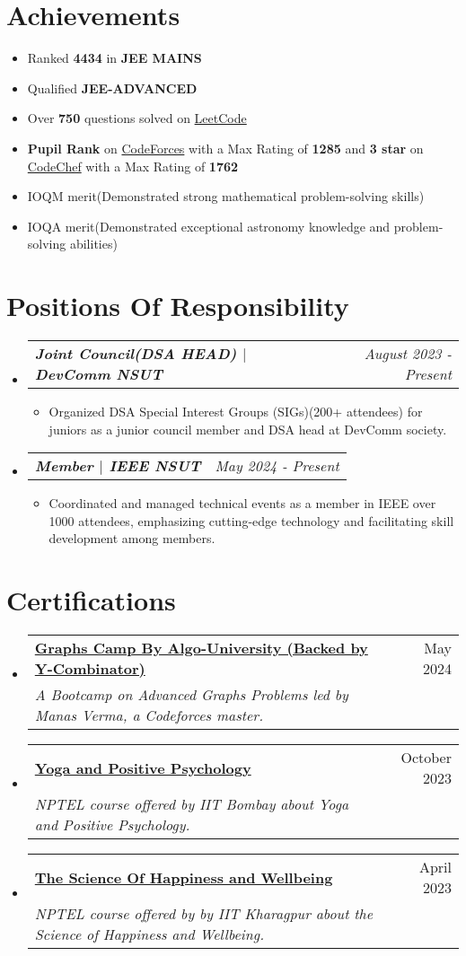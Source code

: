 \documentclass[letterpaper,11pt]{article}
\makeatletter
\newcommand{\resumeItem}[1]{
  \item\small{
    {#1 \vspace{-4pt}}
  }
}
\newcommand{\resumeSubheading}[4]{
  \vspace{-2pt}\item
    \begin{tabular*}{0.97\textwidth}[t]{l@{\extracolsep{\fill}}r}
      \textbf{\small#1} & \small#2 \\
      \textit{\small#3} & \textit{\small #4} \\
    \end{tabular*}\vspace{-7pt}
}
\newcommand{\resumeSubSubheading}[2]{
    \item
    \begin{tabular*}{0.97\textwidth}{l@{\extracolsep{\fill}}r}
      \textit{\small#1} & \textit{\small #2} \\
    \end{tabular*}\vspace{-9pt}
}
\newcommand{\resumeSubItem}[1]{\resumeItem{#1}\vspace{-4.5pt}}
\newcommand{\resumeSubHeadingListStart}{\begin{itemize}[leftmargin=0.15in, label={}]}
\newcommand{\resumeSubHeadingListEnd}{\end{itemize}}
\newcommand{\resumeSubItemListStart}{\begin{itemize}[leftmargin=0.25in]}
\newcommand{\resumeSubItemListEnd}{\end{itemize}\vspace{-6pt}}
\makeatother
\begin{document}
\section{Achievements}
    \resumeSubItemListStart
    \resumeSubItem{Ranked \textbf{4434} in \textbf{JEE MAINS}}
    \resumeSubItem{Qualified \textbf{JEE-ADVANCED}}
    \resumeSubItem{Over \textbf{750} questions solved on {\href{https://leetcode.com/u/pj_failure2004/} {LeetCode}}}
    \resumeSubItem{\textbf{Pupil Rank} on {\href{https://codeforces.com/profile/pj9279247} {CodeForces}} with a Max Rating of \textbf{1285} and \textbf{3 star} on {\href{https://www.codechef.com/users/pjfailure} {CodeChef} with a Max Rating of \textbf{1762}}}
    \resumeSubItem{IOQM merit(Demonstrated strong mathematical problem-solving skills)}
     \resumeSubItem{IOQA merit(Demonstrated exceptional astronomy knowledge and problem-solving abilities)}
    \resumeSubItemListEnd

\section{Positions Of Responsibility}
  \resumeSubHeadingListStart
  \resumeSubSubheading{\textbf{Joint Council(DSA HEAD) $|$ DevComm NSUT}}{August 2023 - Present}
  \begin{itemize}[leftmargin=0.00in, label={}]
      \item \small{Organized DSA Special Interest Groups (SIGs)(200+ attendees) for juniors as a junior council member and DSA head at DevComm society.}\vspace{-8pt}
  \end{itemize}
  \resumeSubSubheading{\textbf{Member $|$ IEEE NSUT}}{May 2024 - Present}
  \begin{itemize}[leftmargin=0.00in, label={}]
      \item \small{Coordinated and managed technical events as a  member in IEEE over 1000 attendees, emphasizing cutting-edge technology and facilitating skill development among members.} 
  \end{itemize}
  \resumeSubHeadingListEnd

\section{Certifications}
  \resumeSubHeadingListStart
  \resumeSubheading{\href{https://drive.google.com/file/d/1i04tes_wnvaPNyVKIsK1UsGagRXO57Tw/view?usp=sharing}{Graphs Camp By Algo-University (Backed by Y-Combinator)}}{May 2024}{A Bootcamp on Advanced Graphs Problems led by Manas Verma, a Codeforces master.}{}
    \resumeSubheading{\href{https://drive.google.com/file/d/1cIHyLfsI7hHTyFlfFUvpJth4eRODavHL/view?usp=sharing}{Yoga and Positive Psychology}}{October 2023}{NPTEL course offered by IIT Bombay about Yoga and Positive Psychology.}{}
    \resumeSubheading{\href{https://drive.google.com/file/d/1qJL1b32kZU6VD3xQ0EAOb_tXroqUTyou/view?usp=sharing}{The Science Of Happiness and Wellbeing}}{April 2023}{NPTEL course offered by  by IIT Kharagpur about the Science of Happiness and Wellbeing.}{}
  \resumeSubHeadingListEnd

\end{document}
